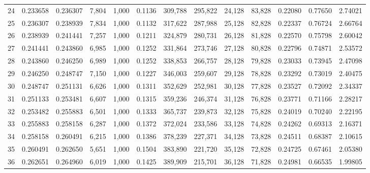 \begin{tabular}{rrrrrrrrrrrrr}
24  &  0.233658 &  0.236307 &   7,804 &  1,000 &                                     0.1136 &  309,788 &  295,822 &   24,128 &   83,828 &  0.22080 &  0.77650 &  2.74021 \\
25  &  0.236307 &  0.238939 &   7,834 &  1,000 &                                     0.1132 &  317,622 &  287,988 &   25,128 &   82,828 &  0.22337 &  0.76724 &  2.66764 \\
26  &  0.238939 &  0.241441 &   7,257 &  1,000 &                                     0.1211 &  324,879 &  280,731 &   26,128 &   81,828 &  0.22570 &  0.75798 &  2.60042 \\
27  &  0.241441 &  0.243860 &   6,985 &  1,000 &                                     0.1252 &  331,864 &  273,746 &   27,128 &   80,828 &  0.22796 &  0.74871 &  2.53572 \\
28  &  0.243860 &  0.246250 &   6,989 &  1,000 &                                     0.1252 &  338,853 &  266,757 &   28,128 &   79,828 &  0.23033 &  0.73945 &  2.47098 \\
29  &  0.246250 &  0.248747 &   7,150 &  1,000 &                                     0.1227 &  346,003 &  259,607 &   29,128 &   78,828 &  0.23292 &  0.73019 &  2.40475 \\
30  &  0.248747 &  0.251131 &   6,626 &  1,000 &                                     0.1311 &  352,629 &  252,981 &   30,128 &   77,828 &  0.23527 &  0.72092 &  2.34337 \\
31  &  0.251133 &  0.253481 &   6,607 &  1,000 &                                     0.1315 &  359,236 &  246,374 &   31,128 &   76,828 &  0.23771 &  0.71166 &  2.28217 \\
32  &  0.253482 &  0.255883 &   6,501 &  1,000 &                                     0.1333 &  365,737 &  239,873 &   32,128 &   75,828 &  0.24019 &  0.70240 &  2.22195 \\
33  &  0.255883 &  0.258158 &   6,287 &  1,000 &                                     0.1372 &  372,024 &  233,586 &   33,128 &   74,828 &  0.24262 &  0.69313 &  2.16371 \\
34  &  0.258158 &  0.260491 &   6,215 &  1,000 &                                     0.1386 &  378,239 &  227,371 &   34,128 &   73,828 &  0.24511 &  0.68387 &  2.10615 \\
35  &  0.260491 &  0.262650 &   5,651 &  1,000 &                                     0.1504 &  383,890 &  221,720 &   35,128 &   72,828 &  0.24725 &  0.67461 &  2.05380 \\
36  &  0.262651 &  0.264960 &   6,019 &  1,000 &                                     0.1425 &  389,909 &  215,701 &   36,128 &   71,828 &  0.24981 &  0.66535 &  1.99805 \\

\end{tabular}
